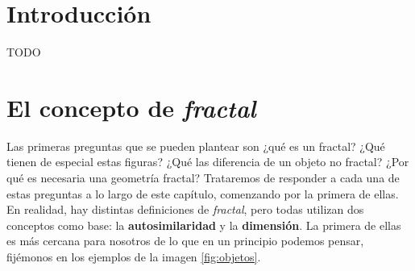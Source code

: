 \documentclass[11pt]{report}
\begin{document}
\listoffigures
\thispagestyle{plain}

\listoftables
\thispagestyle{plain}


\chapter*{Introducción}
\setcounter{page}{1}


TODO


\chapter{El concepto de \textit{fractal}}
\label{chap:concepto}

Las primeras preguntas que se pueden plantear son ¿qué es un fractal? ¿Qué tienen de especial estas figuras? ¿Qué las diferencia de un objeto no fractal? ¿Por qué es necesaria una geometría fractal? Trataremos de responder a cada una de estas preguntas a lo largo de este capítulo, comenzando por la primera de ellas. En realidad, hay distintas definiciones de \textit{fractal}, pero todas utilizan dos conceptos como base: la \textbf{autosimilaridad} y la \textbf{dimensión}. La primera de ellas es más cercana para nosotros de lo que en un principio podemos pensar, fijémonos en los ejemplos de la imagen \ref{fig:objetos}. 
\end{document}

